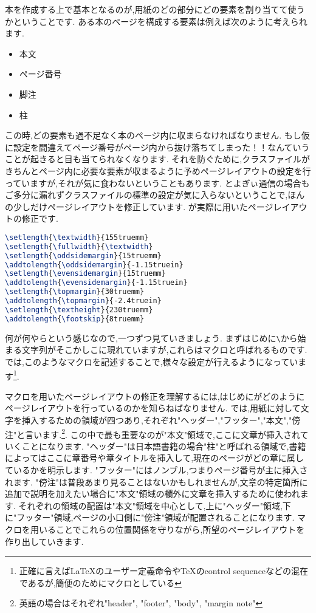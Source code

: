 本を作成する上で基本となるのが,用紙のどの部分にどの要素を割り当てて使うかということです.
ある本のページを構成する要素は例えば次のように考えられます.
\begin{itemize}
	\item 本文
	\item ページ番号
	\item 脚注
	\item 柱
\end{itemize}
この時,どの要素も過不足なく本のページ内に収まらなければなりません.
もし仮に設定を間違えてページ番号がページ内から抜け落ちてしまった！！なんていうことが起きると目も当てられなくなります.
それを防ぐために,クラスファイルがきちんとページ内に必要な要素が収まるように予めページレイアウトの設定を行っていますが,それが気に食わないということもあります.
とよぎぃ通信の場合もご多分に漏れずクラスファイルの標準の設定が気に入らないということで,ほんの少しだけページレイアウトを修正しています.
が実際に用いたページレイアウトの修正です.
\begin{lstlisting}[caption = ページレイアウトの修正,label = list:layout,language = tex]
\setlength{\textwidth}{155truemm}
\setlength{\fullwidth}{\textwidth}
\setlength{\oddsidemargin}{15truemm}
\addtolength{\oddsidemargin}{-1.15truein}
\setlength{\evensidemargin}{15truemm}
\addtolength{\evensidemargin}{-1.15truein}
\setlength{\topmargin}{30truemm}
\addtolength{\topmargin}{-2.4truein}
\setlength{\textheight}{230truemm}
\addtolength{\footskip}{8truemm}
\end{lstlisting}
何が何やらという感じなので,一つずつ見ていきましょう.
まずはじめに\verb|\|から始まる文字列がそこかしこに現れていますが,これらはマクロと呼ばれるものです.
{\pLaTeX}では,このようなマクロを記述することで,様々な設定が行えるようになっています\footnote{正確に言えば{\LaTeX}のユーザー定義命令や{\TeX}のcontrol sequenceなどの混在であるが,簡便のためにマクロとしている}.

マクロを用いたページレイアウトの修正を理解するには,はじめに{\pLaTeX}がどのようにページレイアウトを行っているのかを知らねばなりません.
{\pLaTeX}では,用紙に対して文字を挿入するための領域が四つあり,それぞれ"ヘッダー","フッター","本文","傍注"と言います.\footnote{英語の場合はそれぞれ"header", "footer", "body", "margin note"}.
この中で最も重要なのが"本文"領域で,ここに文章が挿入されていくことになります.
"ヘッダー"は日本語書籍の場合"柱"と呼ばれる領域で,書籍によってはここに章番号や章タイトルを挿入して,現在のページがどの章に属しているかを明示します.
"フッター"にはノンブル,つまりページ番号が主に挿入されます.
"傍注"は普段あまり見ることはないかもしれませんが,文章の特定箇所に追加で説明を加えたい場合に"本文"領域の欄外に文章を挿入するために使われます.
それぞれの領域の配置は"本文"領域を中心として,上に"ヘッダー"領域,下に"フッター"領域,ページの小口側に"傍注"領域が配置されることになります.
マクロを用いることでこれらの位置関係を守りながら,所望のページレイアウトを作り出していきます.

